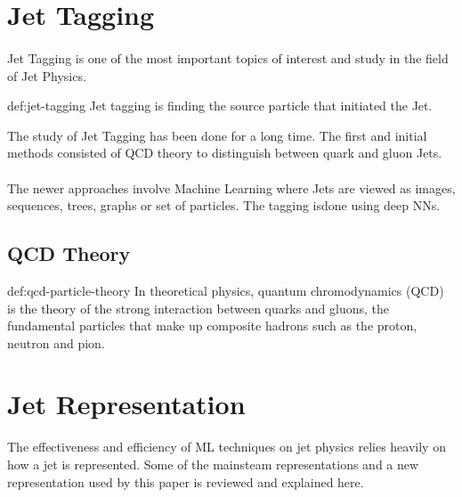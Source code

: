 
\section{Jet Tagging}

\paragraph{} Jet Tagging is one of the most important topics of interest and study in the  field of Jet Physics.

\begin{definition}{def:jet-tagging}
    Jet tagging is finding the source particle that initiated the Jet.
\end{definition}

\noindent The study of Jet Tagging has been done for a long time. The first and initial methods consisted of QCD theory to distinguish between quark and gluon Jets.

\paragraph{} The newer approaches involve Machine Learning where Jets are viewed as images, sequences, trees, graphs or set of particles. The tagging isdone using deep NNs.

\subsection{QCD Theory}

\begin{definition}{def:qcd-particle-theory}
    In theoretical physics, quantum chromodynamics (QCD) is the theory of the strong interaction between quarks and gluons, the fundamental particles that make up composite hadrons such as the proton, neutron and pion.
\end{definition}

\section{Jet Representation}
The effectiveness and efficiency of ML techniques on jet physics relies 
heavily on how a jet is represented. Some of the mainsteam representations 
and a new representation used by this paper is reviewed and explained here.

